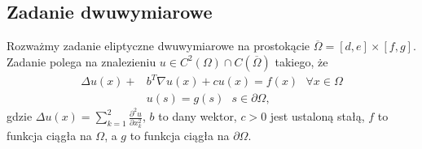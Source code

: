 \documentclass[12pt, letterpaper]{article}
\theoremstyle{plain}
\numberwithin{equation}{section}
\begin{document}
\subsection{Zadanie dwuwymiarowe}
Rozważmy zadanie eliptyczne dwuwymiarowe na prostokącie $\overline{\Omega}=[d,e]\times [f,g]$. Zadanie polega na znalezieniu $u\in C^2(\Omega)\cap C(\overline{\Omega})$ takiego, że
\begin{equation}
\begin{split}
\Delta u(x)+&b^T\nabla u(x)+cu(x)=f (x)\:\:\:\forall x\in\Omega \\
&u(s)=g(s)\:\:\: s\in \partial \Omega,
\end{split}
\end{equation}
gdzie $\Delta u(x)=\sum_{k=1}^{2}\frac{\partial^2u}{\partial x^2_k}$, $b$ to dany wektor, $c>0$ jest ustaloną stałą, $f$ to funkcja ciągła na $\Omega$, a $g$ to funkcja ciągła na $\partial\Omega$.
\end{document}
